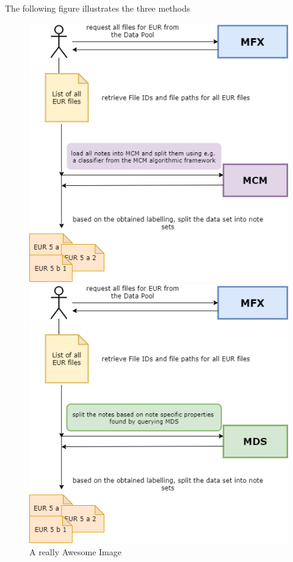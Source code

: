 \par The following figure illustrates the three methods

\begin{figure}[!htb]
  \includegraphics[width=\linewidth]{images/label_mcm_approach.png}
  \caption{A really Awesome Image}\label{fig:awesome_image1}
\endminipage\hfill
{}
  \includegraphics[width=\linewidth]{images/label_mds_approach.png}

\end{figure}

